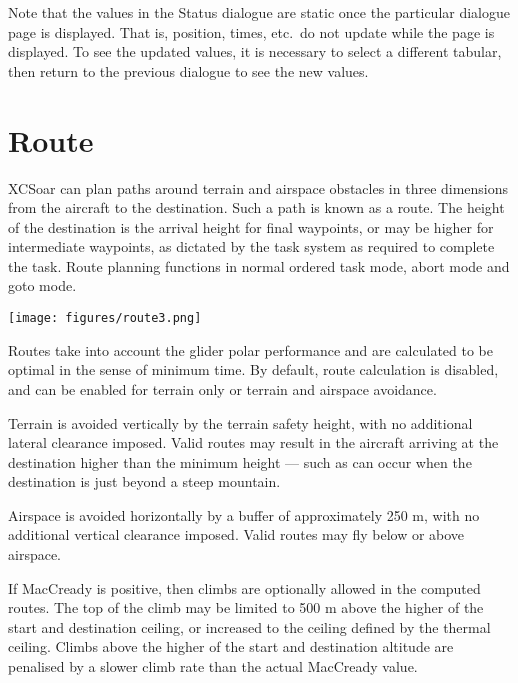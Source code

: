 Note that the values in the Status dialogue 
are static once the particular dialogue page is displayed. 
That is, position, times, etc.\ do not update while the page is displayed.
To see the updated values, it is necessary to select a different tabular, 
then return to the previous dialogue to see the new values.


\section{Route}\label{sec:route}

XCSoar can plan paths around terrain and airspace obstacles in three
dimensions from the aircraft to the destination.  Such a path is known
as a route.  The height of the destination is the arrival height for
final waypoints, or may be higher for intermediate waypoints, as
dictated by the task system as required to complete the task.  Route
planning functions in normal ordered task mode, abort mode and goto
mode.

\begin{center}
\texttt{[image: figures/route3.png]}
\end{center}

Routes take into account the glider polar performance and are
calculated to be optimal in the sense of minimum time.  By default,
route calculation is disabled, and can be enabled for terrain only or
terrain and airspace avoidance. 

Terrain is avoided vertically by the terrain safety height,
with no additional lateral clearance imposed.
Valid routes may result in the aircraft arriving at the destination
higher than the minimum height --- such as can occur when the
destination is just beyond a steep mountain.

Airspace is avoided horizontally by a buffer of approximately 250 m,
with no additional vertical clearance imposed.  Valid routes may fly
below or above airspace.

If MacCready is positive, then climbs are optionally allowed
 in the computed routes.  The top of the climb
may be limited to 500 m above the higher of the start and destination
ceiling, or increased to the ceiling defined by the thermal ceiling.
  Climbs above the higher of the start and
destination altitude are penalised by a slower climb rate than the
actual MacCready value.

